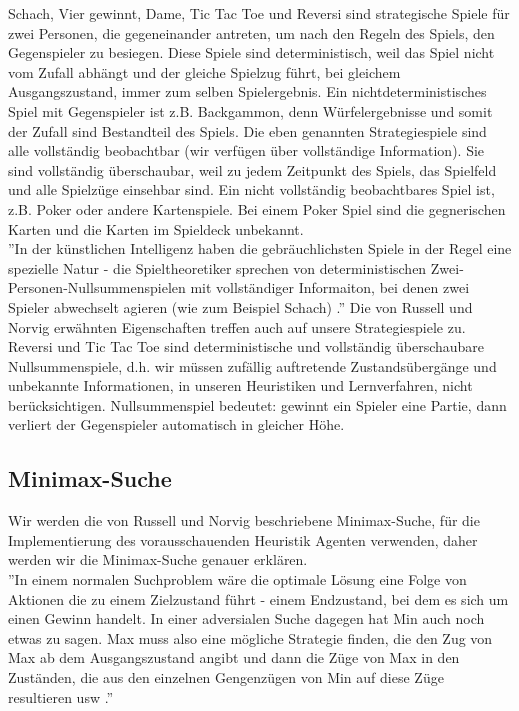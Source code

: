 Schach, Vier gewinnt, Dame, Tic Tac Toe und Reversi sind strategische Spiele für zwei Personen, die gegeneinander antreten, um nach den Regeln des Spiels, den Gegenspieler zu besiegen. Diese Spiele sind deterministisch, weil das Spiel nicht vom Zufall abhängt und der gleiche Spielzug führt, bei gleichem Ausgangszustand, immer zum selben Spielergebnis. Ein nichtdeterministisches Spiel mit Gegenspieler ist z.B. Backgammon, denn Würfelergebnisse und somit der Zufall sind Bestandteil des Spiels. Die eben genannten Strategiespiele sind alle vollständig beobachtbar (wir verfügen über vollständige Information). Sie sind vollständig überschaubar, weil zu jedem Zeitpunkt des Spiels, das Spielfeld und alle Spielzüge einsehbar sind. Ein nicht vollständig beobachtbares Spiel ist, z.B. Poker oder andere Kartenspiele. Bei einem Poker Spiel sind die gegnerischen Karten und die Karten im Spieldeck unbekannt.\\

''In der künstlichen Intelligenz haben die gebräuchlichsten Spiele in der Regel eine spezielle Natur - die Spieltheoretiker sprechen von deterministischen Zwei-Personen-Nullsummenspielen mit vollständiger Informaiton, bei denen zwei Spieler abwechselt agieren (wie zum Beispiel Schach) \cite[206]{Russell}.'' Die von Russell und Norvig erwähnten Eigenschaften treffen auch auf unsere Strategiespiele zu. Reversi und Tic Tac Toe sind deterministische und vollständig überschaubare Nullsummenspiele, d.h. wir müssen zufällig auftretende Zustandsübergänge und unbekannte Informationen, in unseren Heuristiken und Lernverfahren, nicht berücksichtigen. Nullsummenspiel bedeutet: gewinnt ein Spieler eine Partie, dann verliert der Gegenspieler automatisch in gleicher Höhe.

\subsection{Minimax-Suche}
\label{subsec:Minimax}
Wir werden die von Russell und Norvig beschriebene Minimax-Suche, für die Implementierung des vorausschauenden Heuristik Agenten verwenden, daher werden wir die Minimax-Suche genauer erklären. \\

''In einem normalen Suchproblem wäre die optimale Lösung eine Folge von Aktionen die zu einem Zielzustand führt - einem Endzustand, bei dem es sich um einen Gewinn handelt. In einer adversialen Suche dagegen hat Min auch noch etwas zu sagen. Max muss also eine mögliche Strategie finden, die den Zug von Max ab dem Ausgangszustand angibt und dann die Züge von Max in den Zuständen, die aus den einzelnen Gengenzügen von Min auf diese Züge resultieren usw \cite[208]{Russell}.''

